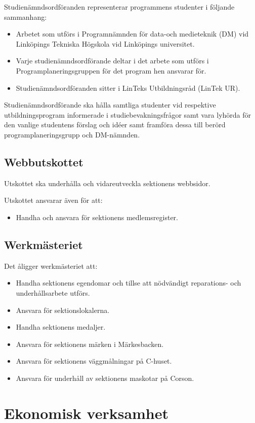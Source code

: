 \documentclass{datateknologsektionen-document}
\begin{document}
Studienämndsordföranden representerar programmens studenter i följande sammanhang:
\begin{itemize}
  \item Arbetet som utförs i Programnämnden för data-och medieteknik (DM) vid Linköpings Tekniska Högskola vid Linköpings universitet.
  \item Varje studienämndsordförande deltar i det arbete som utförs i Programplaneringsgruppen för det program hen ansvarar för.
  \item Studienämndsordföranden sitter i LinTeks Utbildningsråd (LinTek UR).
\end{itemize}

Studienämndsordförande ska hålla samtliga studenter vid respektive utbildningsprogram
informerade i studiebevakningsfrågor samt vara lyhörda för den vanlige studentens
förslag och idéer samt framföra dessa till berörd programplaneringsgrupp och DM-nämnden.

\subsection{Webbutskottet}
Utskottet ska underhålla och vidareutveckla sektionens webbsidor.

Utskottet ansvarar även för att:
\begin{itemize}
  \item Handha och ansvara för sektionens medlemsregister.
\end{itemize}

\subsection{Werkmästeriet}
Det åligger werkmästeriet att:
\begin{itemize}
  \item Handha sektionens egendomar och tillse att nödvändigt reparations- och underhållsarbete utförs.
  \item Ansvara för sektionslokalerna.
  \item Handha sektionens medaljer.
  \item Ansvara för sektionens märken i Märkesbacken.
  \item Ansvara för sektionens väggmålningar på C-huset.
  \item Ansvara för underhåll av sektionens maskotar på Corson.
\end{itemize}

\section{Ekonomisk verksamhet}
\end{document}
